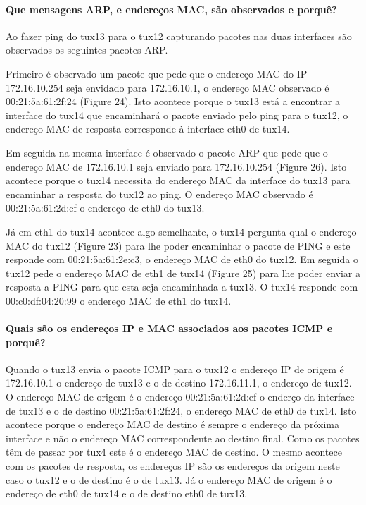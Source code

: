 \paragraph{Que mensagens ARP, e endereços MAC, são observados e porquê?}

Ao fazer ping do tux13 para o tux12 capturando pacotes nas duas interfaces são observados os seguintes pacotes ARP.

Primeiro é observado um pacote que pede que o endereço MAC do IP 172.16.10.254 seja envidado para 172.16.10.1, o endereço MAC observado é 00:21:5a:61:2f:24 (Figure 24).
Isto acontece porque o tux13 está a encontrar a interface do tux14 que encaminhará o pacote enviado pelo ping para o tux12, o endereço MAC de resposta corresponde à interface eth0 de tux14.

Em seguida na mesma interface é observado o pacote ARP que pede que o endereço MAC de 172.16.10.1 seja enviado para 172.16.10.254 (Figure 26).
Isto acontece porque o tux14 necessita do endereço MAC da interface do tux13 para encaminhar a resposta do tux12 ao ping. O endereço MAC observado é 00:21:5a:61:2d:ef o endereço de eth0 do tux13.

Já em eth1 do tux14 acontece algo semelhante, o tux14 pergunta qual o endereço MAC do tux12 (Figure 23) para lhe poder encaminhar o pacote de PING e este responde com 00:21:5a:61:2e:c3, o endereço MAC de eth0 do tux12. Em seguida o tux12 pede o endereço MAC de eth1 de tux14 (Figure 25) para lhe poder enviar a resposta a PING para que esta seja encaminhada a tux13. O tux14 responde com 00:c0:df:04:20:99 o endereço MAC de eth1 do tux14.

\paragraph{Quais são os endereços IP e MAC associados aos pacotes ICMP e porquê?}

Quando o tux13 envia o pacote ICMP para o tux12 o endereço IP de origem é 172.16.10.1 o endereço de tux13 e o de destino 172.16.11.1, o endereço de tux12. O endereço MAC de origem é o endereço 00:21:5a:61:2d:ef o enderço da interface de tux13 e o de destino 00:21:5a:61:2f:24, o endereço MAC de eth0 de tux14. Isto acontece porque o endereço MAC de destino é sempre o endereço da próxima interface e não o endereço MAC correspondente ao destino final. Como os pacotes têm de passar por tux4 este é o endereço MAC de destino. O mesmo acontece com os pacotes de resposta, os endereços IP são os endereços da origem neste caso o tux12 e o de destino é o de tux13. Já o endereço MAC de origem é o endereço de eth0 de tux14 e o de destino eth0 de tux13.

